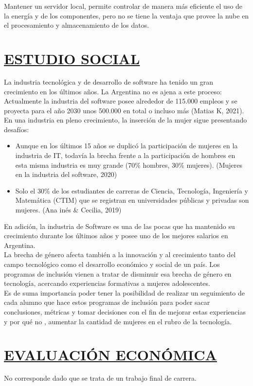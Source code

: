 Mantener un servidor local, permite controlar de manera más eficiente el uso de la energía y de los componentes, pero no se tiene la ventaja que provee la nube en el procesamiento y almacenamiento de los datos.\\




\section*{\underline{ESTUDIO SOCIAL}}
La industria tecnológica y de desarrollo de software ha tenido un gran crecimiento en los últimos años. La Argentina no es ajena a este proceso: Actualmente la industria del software posee alrededor de 115.000 empleos y se proyecta para el año 2030 unos 500.000 en total o incluso más \textbf{\cite{EmpleosUltAnios}}(Matias K, 2021).\\

En una industria en pleno crecimiento, la inserción de la mujer sigue presentando desafíos:
\begin{itemize}
	\item Aunque en los últimos 15 años se duplicó la participación de mujeres en la industria de IT, todavía la brecha frente a la participación de hombres en esta misma industria es muy grande (70\% hombres, 30\% mujeres).  \textbf{\cite{DuplMujeres}}(Mujeres en la industria del software, 2020)
	\item Solo el 30\% de los estudiantes de carreras de Ciencia, Tecnología, Ingeniería y Matemática (CTIM) que se registran en universidades públicas y privadas son mujeres. \textbf{\cite{MujeresCtim}}(Ana inés \& Cecilia, 2019)\\
\end{itemize}

En adición, la industria de Software es una de las pocas que ha mantenido su crecimiento durante los últimos años y posee uno de los mejores salarios en Argentina.\\

La brecha de género afecta también a la innovación y al crecimiento tanto del campo tecnológico como el desarrollo económico y social de un país. Los programas de inclusión vienen a tratar de disminuir esa brecha de género en tecnología, acercando experiencias formativas a mujeres adolescentes.\\

Es de suma importancia poder tener la posibilidad de realizar un seguimiento de cada alumno que hace estos programas de inclusión para poder sacar conclusiones, métricas y tomar decisiones con el fin de mejorar estas experiencias y por qué no , aumentar la cantidad de mujeres en el rubro de la tecnología. \\

\section*{\underline{EVALUACIÓN ECONÓMICA}}
No corresponde dado que se trata de un trabajo final de carrera.
